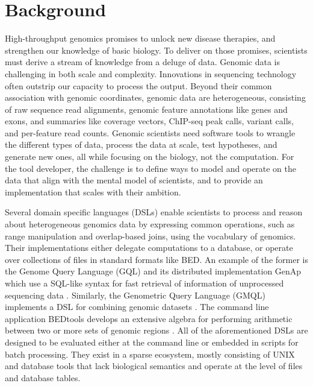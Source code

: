 \documentclass[]{article}
\begin{document}
\vskip 6.5pt


\noindent  \hypertarget{background}{%
\section{Background}\label{background}}

High-throughput genomics promises to unlock new disease therapies, and
strengthen our knowledge of basic biology. To deliver on those promises,
scientists must derive a stream of knowledge from a deluge of data.
Genomic data is challenging in both scale and complexity. Innovations in
sequencing technology often outstrip our capacity to process the output.
Beyond their common association with genomic coordinates, genomic data
are heterogeneous, consisting of raw sequence read alignments, genomic
feature annotations like genes and exons, and summaries like coverage
vectors, ChIP-seq peak calls, variant calls, and per-feature read
counts. Genomic scientists need software tools to wrangle the different
types of data, process the data at scale, test hypotheses, and generate
new ones, all while focusing on the biology, not the computation. For
the tool developer, the challenge is to define ways to model and operate
on the data that align with the mental model of scientists, and to
provide an implementation that scales with their ambition.

Several domain specific languages (DSLs) enable scientists to process
and reason about heterogeneous genomics data by expressing common
operations, such as range manipulation and overlap-based joins, using
the vocabulary of genomics. Their implementations either delegate
computations to a database, or operate over collections of files in
standard formats like BED. An example of the former is the Genome Query
Language (GQL) and its distributed implementation GenAp which use a
SQL-like syntax for fast retrieval of information of unprocessed
sequencing data \autocites{Kozanitis2014-va}{Kozanitis2016-bm}.
Similarly, the Genometric Query Language (GMQL) implements a DSL for
combining genomic datasets \cite{Kaitoua2017-pw}. The command line
application BEDtools develops an extensive algebra for performing
arithmetic between two or more sets of genomic regions
\cite{Quinlan2010-gc}. All of the aforementioned DSLs are designed to be
evaluated either at the command line or embedded in scripts for batch
processing. They exist in a sparse ecosystem, mostly consisting of UNIX
and database tools that lack biological semantics and operate at the
level of files and database tables.
\end{document}

